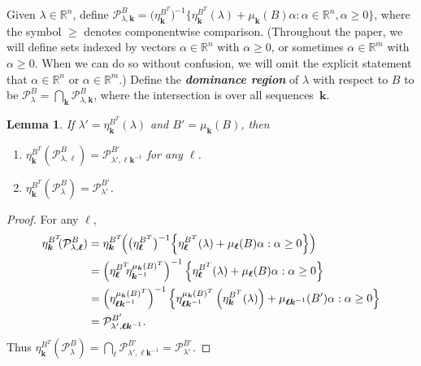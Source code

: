 \documentclass{amsart}
\newtheorem{lemma}[proposition]{Lemma}
\theoremstyle{definition}
\theoremstyle{remark}
\numberwithin{equation}{section}
\newcommand{\newword}[1]{\textbf{\emph{#1}}}
\newcommand{\reals}{\mathbb R}
\newcommand{\set}[1]{{\lbrace #1 \rbrace}}
\newcommand{\sett}[1]{{\bigl\lbrace #1 \bigr\rbrace}}
\newcommand{\settt}[1]{{\Bigl\lbrace #1 \Bigr\rbrace}}
\newcommand{\0}{{\mathbf{0}}}
\newcommand{\kk}{{\boldsymbol{k}}}
\renewcommand{\ll}{{\boldsymbol\ell}}
\renewcommand{\P}{\mathcal{P}}
\begin{document}
Given $\lambda\in\reals^n$, define $\P^B_{\lambda,\kk}=\bigl(\eta_{\kk}^{B^T}\bigr)^{-1}\sett{\eta_\kk^{B^T}(\lambda)+\mu_\kk(B)\alpha:\alpha\in\reals^n,\alpha\ge0}$, where the symbol $\ge$ denotes componentwise comparison.
(Throughout the paper, we will define sets indexed by vectors $\alpha\in\reals^n$ with $\alpha\ge0$, or sometimes $\alpha\in\reals^m$ with $\alpha\ge0$.
When we can do so without confusion, we will omit the explicit statement that $\alpha\in\reals^n$ or $\alpha\in\reals^m$.)
Define the \newword{dominance region} of $\lambda$ with respect to $B$ to be $\P^B_\lambda=\bigcap_\kk\P^B_{\lambda,\kk}$, where the intersection is over all sequences~$\kk$.
\begin{lemma}\label{shift}
If $\lambda'=\eta^{B^T}_\kk(\lambda)$ and $B'=\mu_\kk(B)$, then 
\begin{enumerate}[\quad\bf1.]
\item \label{shift one}
$\eta^{B^T}_\kk\!\!(\P^B_{\lambda,\ll})=\P^{B'}_{\lambda',\ll\kk^{-1}}$ for any $\ll$.
\item \label{shift all}
$\eta^{B^T}_\kk\!\!(\P^B_\lambda)=\P^{B'}_{\lambda'}$.
\end{enumerate}
\end{lemma}
\begin{proof}
For any $\ll$,
\begin{align*}
\eta^{B^T}_\kk\!\!(\P^B_{\lambda,\ll})
&=\eta^{B^T}_\kk\!\!\left(\bigl(\eta_{\ll}^{B^T}\bigr)^{-1}\settt{\eta_\ll^{B^T}(\lambda)+\mu_\ll(B)\alpha:\alpha\ge0}\right)\\
&=\left(\eta^{B^T}_\ll\!\!\eta_{\kk^{-1}}^{\mu_\kk(B)^T}\right)^{-1}\settt{\eta_\ll^{B^T}(\lambda)+\mu_\ll(B)\alpha:\alpha\ge0}\\
&=\left(\eta^{\mu_\kk(B)^T}_{\ll\kk^{-1}}\right)^{-1}\settt{\eta^{\mu_\kk(B)^T}_{\ll\kk^{-1}}\left(\eta^{B^T}_\kk(\lambda)\right)+\mu_{\ll\kk^{-1}}(B')\alpha:\alpha\ge0}\\
&=\P^{B'}_{\lambda',\ll\kk^{-1}}.
\end{align*}
Thus $\eta^{B^T}_\kk\!\!(\P^B_\lambda)=\bigcap_\ll\P^{B'}_{\lambda',\ll\kk^{-1}}=\P^{B'}_{\lambda'}$.
\end{proof}
\end{document}
